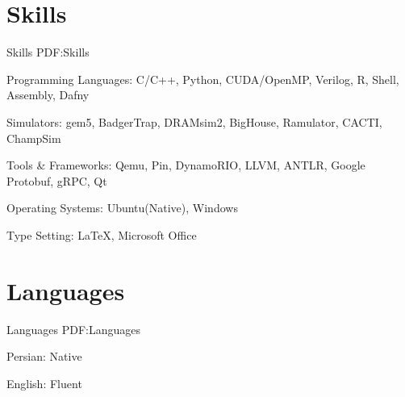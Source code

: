\documentclass[a4paper,9pt,oneside]{article}
\begin{document}
\begin{body}


\section
{Skills}
{Skills}
{PDF:Skills}

\BulletItem
Programming Languages:
C/C++,
Python,
CUDA/OpenMP,
Verilog,
R,
Shell,
Assembly,
Dafny

\BulletItem
Simulators:
gem5,
BadgerTrap,
DRAMsim2,
BigHouse,
Ramulator,
CACTI,
ChampSim

\BulletItem
Tools \& Frameworks:
Qemu,
Pin,
DynamoRIO,
LLVM,
ANTLR,
Google Protobuf,
gRPC,
Qt

\BulletItem
Operating Systems:
Ubuntu(Native),
Windows

\BulletItem
Type Setting:
{\LaTeX},
Microsoft Office



\section
{Languages}
{Languages}
{PDF:Languages}

\BulletItem
Persian: Native

\GapNoBreak
\BulletItem
English: Fluent



\end{body}

\end{document}
